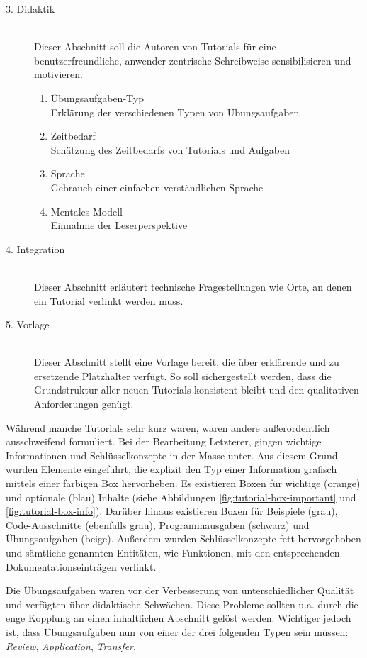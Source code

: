 \begin{description}
  \item[3. Didaktik] \hfill \\
  Dieser Abschnitt soll die Autoren von Tutorials für eine benutzerfreundliche, anwender-zentrische Schreibweise sensibilisieren und motivieren.
  \begin{enumerate}
    \item Übungsaufgaben-Typ\\Erklärung der verschiedenen Typen von Übungsaufgaben 
    \item Zeitbedarf\\Schätzung des Zeitbedarfs von Tutorials und Aufgaben
    \item Sprache\\Gebrauch einer einfachen verständlichen Sprache
    \item Mentales Modell\\Einnahme der Leserperspektive
  \end{enumerate}
  
  \item[4. Integration] \hfill \\
  Dieser Abschnitt erläutert technische Fragestellungen wie Orte, an denen ein Tutorial verlinkt werden muss.
  \item[5. Vorlage] \hfill \\
  Dieser Abschnitt stellt eine Vorlage bereit, die über erklärende und zu ersetzende Platzhalter verfügt. So soll sichergestellt werden, dass die Grundstruktur aller neuen Tutorials konsistent bleibt und den qualitativen Anforderungen genügt.
\end{description}

Während manche Tutorials sehr kurz waren, waren andere außerordentlich ausschweifend formuliert. Bei der Bearbeitung Letzterer, gingen wichtige Informationen und Schlüsselkonzepte in der Masse unter. Aus diesem Grund wurden Elemente eingeführt, die explizit den Typ einer Information grafisch mittels einer farbigen Box hervorheben. Es existieren Boxen für wichtige (orange) und optionale (blau) Inhalte (siehe Abbildungen \ref{fig:tutorial-box-important} und \ref{fig:tutorial-box-info}). Darüber hinaus existieren Boxen für Beispiele (grau), Code-Ausschnitte (ebenfalls grau), Programmausgaben (schwarz) und Übungsaufgaben (beige). Außerdem wurden Schlüsselkonzepte fett hervorgehoben und sämtliche genannten Entitäten, wie Funktionen, mit den entsprechenden Dokumentationseinträgen verlinkt.

Die Übungsaufgaben waren vor der Verbesserung von unterschiedlicher Qualität und verfügten über didaktische Schwächen. Diese Probleme sollten u.a. durch die enge Kopplung an einen inhaltlichen Abschnitt gelöst werden. Wichtiger jedoch ist, dass Übungsaufgaben nun von einer der drei folgenden Typen sein müssen: \textit{Review}, \textit{Application}, \textit{Transfer}.

